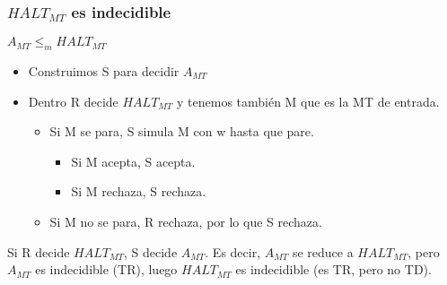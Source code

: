 \subsubsection{$HALT_{MT}$ es indecidible}
$A_{MT} \leq_m HALT_{MT}$
\begin{itemize}
	\item Construimos S para decidir $A_{MT}$
	\item Dentro R decide $HALT_{MT}$ y tenemos también M que es la MT de entrada.
	      \begin{itemize}
		      \item Si M se para, S simula M con w hasta que pare.
		            \begin{itemize}
			            \item Si M acepta, S acepta.
			            \item Si M rechaza, S rechaza.
		            \end{itemize}
		      \item Si M no se para, R rechaza, por lo que S rechaza.
	      \end{itemize}
\end{itemize}

Si R decide $HALT_{MT}$, S decide $A_{MT}$. Es decir, $A_{MT}$ se reduce a $HALT_{MT}$, pero $A_{MT}$ es indecidible (TR), luego $HALT_{MT}$ es indecidible (es TR, pero no TD).